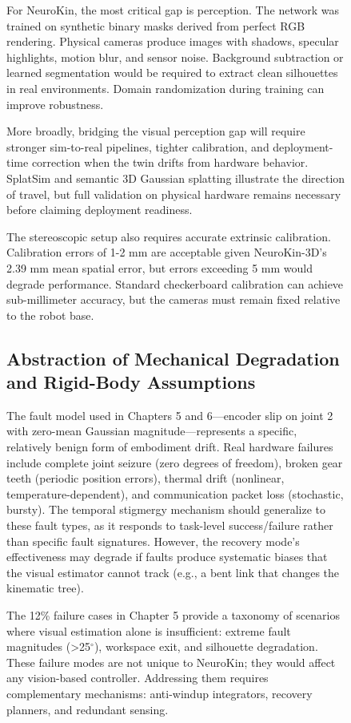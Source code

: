 \documentclass[12pt,a4paper,oneside]{report}
\begin{document}
\begin{figure}[H]
For NeuroKin, the most critical gap is perception. The network was trained on synthetic binary masks derived from perfect RGB rendering. Physical cameras produce images with shadows, specular highlights, motion blur, and sensor noise. Background subtraction or learned segmentation would be required to extract clean silhouettes in real environments. Domain randomization during training can improve robustness.

More broadly, bridging the visual perception gap will require stronger sim-to-real pipelines, tighter calibration, and deployment-time correction when the twin drifts from hardware behavior. SplatSim \cite{qureshi2025splatsim} and semantic 3D Gaussian splatting \cite{tang2025semantic} illustrate the direction of travel, but full validation on physical hardware remains necessary before claiming deployment readiness.

The stereoscopic setup also requires accurate extrinsic calibration. Calibration errors of 1-2 mm are acceptable given NeuroKin-3D's 2.39 mm mean spatial error, but errors exceeding 5 mm would degrade performance. Standard checkerboard calibration can achieve sub-millimeter accuracy, but the cameras must remain fixed relative to the robot base.

\subsection{Abstraction of Mechanical Degradation and Rigid-Body Assumptions}

The fault model used in Chapters 5 and 6---encoder slip on joint 2 with zero-mean Gaussian magnitude---represents a specific, relatively benign form of embodiment drift. Real hardware failures include complete joint seizure (zero degrees of freedom), broken gear teeth (periodic position errors), thermal drift (nonlinear, temperature-dependent), and communication packet loss (stochastic, bursty). The temporal stigmergy mechanism should generalize to these fault types, as it responds to task-level success/failure rather than specific fault signatures. However, the recovery mode's effectiveness may degrade if faults produce systematic biases that the visual estimator cannot track (e.g., a bent link that changes the kinematic tree).

The 12\% failure cases in Chapter 5 provide a taxonomy of scenarios where visual estimation alone is insufficient: extreme fault magnitudes (>25$^\circ$), workspace exit, and silhouette degradation. These failure modes are not unique to NeuroKin; they would affect any vision-based controller. Addressing them requires complementary mechanisms: anti-windup integrators, recovery planners, and redundant sensing.


\end{figure}
\end{document}
